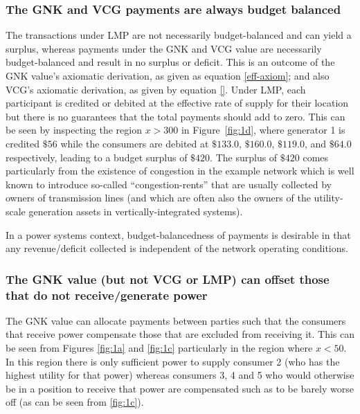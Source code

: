 
\subsubsection*{The GNK and VCG payments are always budget balanced}
The transactions under LMP are not necessarily budget-balanced and can yield a surplus, whereas payments under the GNK and VCG value are necessarily budget-balanced and result in no surplus or deficit.
This is an outcome of the GNK value's axiomatic derivation, as given as equation \eqref{eff-axiom}; and also VCG's axiomatic derivation, as given by equation \ref{}.
Under LMP, each participant is credited or debited at the effective rate of supply for their location but there is no guarantees that the total payments should add to zero.
This can be seen by inspecting the region $x>300$ in Figure~\ref{fig:1d}, where generator 1 is credited $\$56$ while the consumers are debited at $\$133.0$, $\$160.0$, $\$119.0$, and $\$64.0$ respectively, leading to a budget surplus of $\$420$.
The surplus of $\$420$ comes particularly from the existence of congestion in the example network which is well known to introduce so-called ``congestion-rents'' that are usually collected by owners of transmission lines \cite{lmp2} (and which are often also the owners of the utility-scale generation assets in vertically-integrated systems).

In a power systems context, budget-balancedness of payments is desirable in that any revenue/deficit collected is independent of the network operating conditions.

\subsubsection*{The GNK value (but not VCG or LMP) can offset those that do not receive/generate power}
The GNK value can allocate payments between parties such that the consumers that receive power compensate those that are excluded from receiving it.
This can be seen from Figures \ref{fig:1a} and \ref{fig:1c} particularly in the region where $x<50$.
In this region there is only sufficient power to supply consumer 2 (who has the highest utility for that power) whereas consumers 3, 4 and 5 who would otherwise be in a position to receive that power are
compensated such as to be barely worse off (as can be seen from \ref{fig:1c}).

